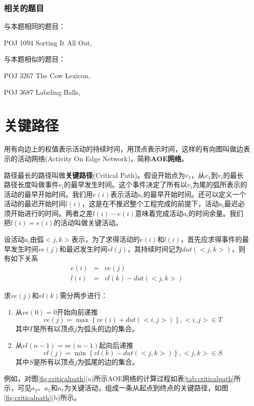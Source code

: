 \subsubsection{相关的题目}
与本题相同的题目：
\begindot
\item POJ 1094 Sorting It All Out, 
\myenddot

与本题相似的题目：
\begindot
\item POJ 3267 The Cow Lexicon, 
\item POJ 3687 Labeling Balls, 
\myenddot

	
\section{关键路径} %
用有向边上的权值表示活动的持续时间，用顶点表示时间，这样的有向图叫做边表示的活动网络(Activity On Edge Network)，简称\textbf{AOE网络}。

路径最长的路径叫做\textbf{关键路径}(Critical Path)。假设开始点为$v_1$，从$v_1$到$v_i$的最长路径长度叫做事件$v_i$的最早发生时间。这个事件决定了所有以$v_i$为尾的弧所表示的活动的最早开始时间。我们用$e(i)$表示活动$a_i$的最早开始时间。还可以定义一个活动的最迟开始时间$l(i)$，这是在不推迟整个工程完成的前提下，活动$a_i$最迟必须开始进行的时间。两者之差$l(i)-e(i)$意味着完成活动$a_i$的时间余量。我们把$l(i)=e(i)$的活动叫做关键活动。

设活动$a_i$由弧$<j, k>$表示，为了求得活动的$e(i)$和$l(i)$，首先应求得事件的最早发生时间$ve(j)$和最迟发生时间$vl(j)$，其持续时间记为$dut(<j, k>)$，则有如下关系
\begin{eqnarray}
e(i) &=& ve(j) \nonumber \\
l(i) &=& vl(k)-dut(<j, k>) \nonumber
\end{eqnarray}

求$ve(j)$和$vl(k)$需分两步进行：
\begin{enumerate}
\item 从$ve(0)=0$开始向前递推
$$
ve(j)=\max\left\{ve(i)+dut(<i, j>)\right\}, <i, j> \in T
$$
其中$T$是所有以顶点$j$为弧头的边的集合。
\item 从$vl(n-1)=ve(n-1)$起向后递推
$$
vl(j)=\min\left\{vl(k)-dut(<j, k>)\right\}, <j, k> \in S
$$
其中$S$是所有以顶点$j$为弧尾的边的集合。
\end{enumerate}

例如，对图\ref{fig:criticalpath}(a)所示AOE网络的计算过程如表\ref{tab:criticalpath}所示，可见$a_2$、$a_5$和$a_7$为关键活动，组成一条从起点到终点的关键路径，如图\ref{fig:criticalpath}(b)所示。

